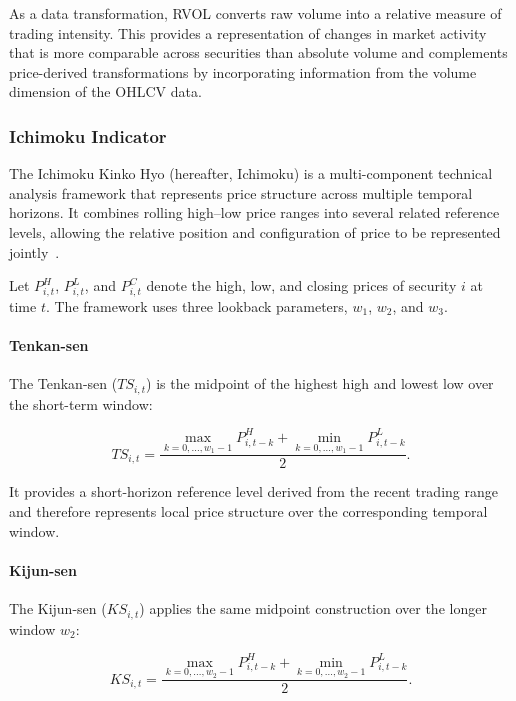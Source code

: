 \medskip

As a data transformation, RVOL converts raw volume into a relative measure of trading intensity. This provides a representation of changes in market activity that is more comparable across securities than absolute volume and complements price-derived transformations by incorporating information from the volume dimension of the \acs{OHLCV} data.
\subsubsection{Ichimoku Indicator}

The Ichimoku Kinko Hyo (hereafter, Ichimoku) is a multi-component technical analysis framework that represents price structure across multiple temporal horizons. It combines rolling high--low price ranges into several related reference levels, allowing the relative position and configuration of price to be represented jointly~\cite{Cahyadi2012,Deng2021}.

Let $P_{i,t}^{H}$, $P_{i,t}^{L}$, and $P_{i,t}^{C}$ denote the high, low, and closing prices of security $i$ at time $t$. The framework uses three lookback parameters, $w_1$, $w_2$, and $w_3$.

\paragraph{Tenkan-sen}

The Tenkan-sen ($TS_{i,t}$) is the midpoint of the highest high and lowest low over the short-term window:

\begin{equation}
    TS_{i,t}
    =
    \frac{
    \max_{k=0,\ldots,w_1-1}P_{i,t-k}^{H}
    +
    \min_{k=0,\ldots,w_1-1}P_{i,t-k}^{L}
    }{2}.
\end{equation}

It provides a short-horizon reference level derived from the recent trading range and therefore represents local price structure over the corresponding temporal window.

\paragraph{Kijun-sen}

The Kijun-sen ($KS_{i,t}$) applies the same midpoint construction over the longer window $w_2$:

\begin{equation}
    KS_{i,t}
    =
    \frac{
    \max_{k=0,\ldots,w_2-1}P_{i,t-k}^{H}
    +
    \min_{k=0,\ldots,w_2-1}P_{i,t-k}^{L}
    }{2}.
\end{equation}

